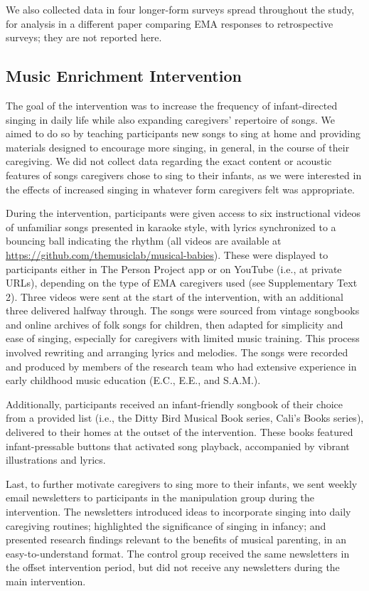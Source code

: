 \documentclass[
]{article}
\begin{document}
We also collected data in four longer-form surveys spread throughout the
study, for analysis in a different paper comparing EMA responses to
retrospective surveys; they are not reported here.

\subsection{Music Enrichment
Intervention}\label{music-enrichment-intervention}

The goal of the intervention was to increase the frequency of
infant-directed singing in daily life while also expanding caregivers'
repertoire of songs. We aimed to do so by teaching participants new
songs to sing at home and providing materials designed to encourage more
singing, in general, in the course of their caregiving. We did not
collect data regarding the exact content or acoustic features of songs
caregivers chose to sing to their infants, as we were interested in the
effects of increased singing in whatever form caregivers felt was
appropriate.

During the intervention, participants were given access to six
instructional videos of unfamiliar songs presented in karaoke style,
with lyrics synchronized to a bouncing ball indicating the rhythm (all
videos are available at
\url{https://github.com/themusiclab/musical-babies}). These were
displayed to participants either in The Person Project app or on YouTube
(i.e., at private URLs), depending on the type of EMA caregivers used
(see Supplementary Text 2). Three videos were sent at the start of the
intervention, with an additional three delivered halfway through. The
songs were sourced from vintage songbooks and online archives of folk
songs for children, then adapted for simplicity and ease of singing,
especially for caregivers with limited music training. This process
involved rewriting and arranging lyrics and melodies. The songs were
recorded and produced by members of the research team who had extensive
experience in early childhood music education (E.C., E.E., and S.A.M.).

Additionally, participants received an infant-friendly songbook of their
choice from a provided list (i.e., the Ditty Bird Musical Book series,
Cali's Books series), delivered to their homes at the outset of the
intervention. These books featured infant-pressable buttons that
activated song playback, accompanied by vibrant illustrations and
lyrics.

Last, to further motivate caregivers to sing more to their infants, we
sent weekly email newsletters to participants in the manipulation group
during the intervention. The newsletters introduced ideas to incorporate
singing into daily caregiving routines; highlighted the significance of
singing in infancy; and presented research findings relevant to the
benefits of musical parenting, in an easy-to-understand format. The
control group received the same newsletters in the offset intervention
period, but did not receive any newsletters during the main
intervention.
\end{document}
